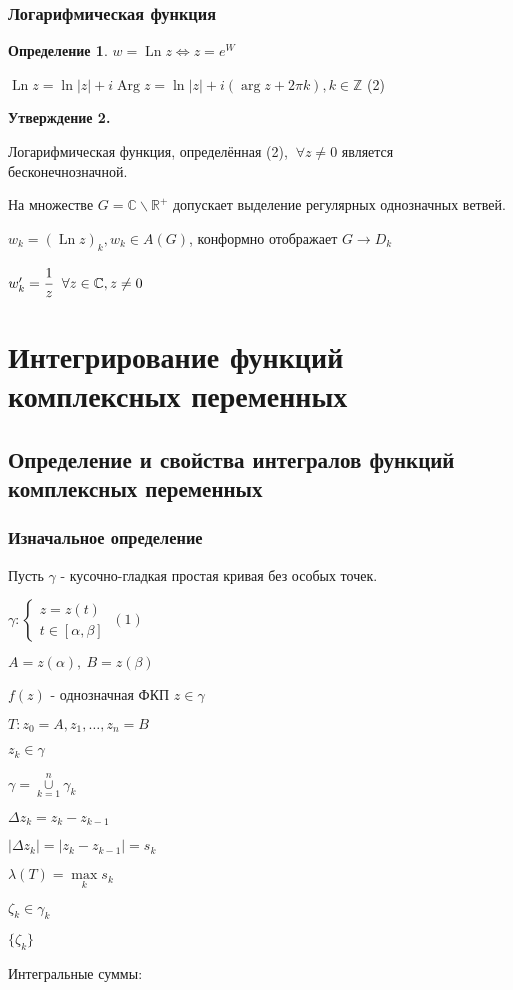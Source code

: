\documentclass[draft]{report}
\newcommand{\R}{\mathbb{R}}
\newcommand{\Z}{\mathbb{Z}}
\renewcommand{\C}{\mathbb{C}}
\newcommand{\LRA}{\Leftrightarrow}
\newcommand{\Ln}{\mathop{\mathrm{Ln}}\nolimits}
\newcommand{\Arg}{\mathop{\mathrm{Arg}}\nolimits}
\renewcommand{\a}{\alpha}
\renewcommand{\b}{\beta}
\newcommand{\g}{\gamma}
\renewcommand{\l}{\lambda}
\newcommand{\D}{\Delta}
\newcommand{\F}{\ \forall}
\newcommand{\sys}[1]{\left\{\begin{matrix}#1\end{matrix}\right.}
\newcommand{\opr}[1]{\begin{opred}#1\end{opred}}
\newtheorem*{opred}{Определение}
\theoremstyle{remark}
\begin{document}
\subsection{Логарифмическая функция}

\opr{$w=\Ln z \LRA z=e^W$}

$\Ln z=\ln|z|+i\Arg z=\ln |z|+i(\arg z+2\pi k), k\in\Z$ (2)

{\bfseries Утверждение 2.}

Логарифмическая функция, определённая (2), $\F z\neq0$ является бесконечнозначной.

На множестве $G=\C\smallsetminus\R^+$ допускает выделение регулярных однозначных ветвей.

$w_k=(\Ln z)_k, w_k\in A(G)$, конформно отображает $G\to D_k$

$w_k'=\cfrac 1z\ \F z\in\C, z\neq0$

\chapter{Интегрирование функций комплексных переменных}

\section{Определение и свойства интегралов функций комплексных переменных}

\subsection{Изначальное определение}

Пусть $\g$ - кусочно-гладкая простая кривая без особых точек.

$\g\colon\sys{z=z(t)\\t\in[\a,\b]}\ (1)$

$A=z(\a),\ B=z(\b)$

$f(z)$ - однозначная ФКП $z\in\g$

$T\colon z_0=A,z_1,\ldots,z_n=B$

$z_k\in\g$

$\g=\overset{n}{\underset{k=1}{\cup}}\g_k$

$\D z_k=z_k-z_{k-1}$

$|\D z_k|=|z_k-z_{k-1}|=s_k$

$\l(T)=\underset{k}{\max}s_k$

$\zeta_k\in\g_k$

$\{\zeta_k\}$

Интегральные суммы:
\end{document}
